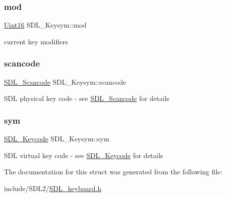 \subsubsection{\texorpdfstring{mod}{mod}}
{\footnotesize\ttfamily \hyperlink{_s_d_l__stdinc_8h_a31fcc0a076c9068668173ee26d33e42b}{Uint16} S\+D\+L\+\_\+\+Keysym\+::mod}

current key modifiers \mbox{\label{struct_s_d_l___keysym_ad47e9120a511e2efc7ec0c6d8a5ec51e}} 
\subsubsection{\texorpdfstring{scancode}{scancode}}
{\footnotesize\ttfamily \hyperlink{_s_d_l__scancode_8h_a82ab7cff701034fb40a47b5b3a02777b}{S\+D\+L\+\_\+\+Scancode} S\+D\+L\+\_\+\+Keysym\+::scancode}

S\+DL physical key code -\/ see \hyperlink{_s_d_l__scancode_8h_a82ab7cff701034fb40a47b5b3a02777b}{S\+D\+L\+\_\+\+Scancode} for details \mbox{\label{struct_s_d_l___keysym_a082ff1fd787b79fa6c3a445deb225f08}} 
\subsubsection{\texorpdfstring{sym}{sym}}
{\footnotesize\ttfamily \hyperlink{_s_d_l__keycode_8h_ae9265f064f13f0f74dfca26a67875171}{S\+D\+L\+\_\+\+Keycode} S\+D\+L\+\_\+\+Keysym\+::sym}

S\+DL virtual key code -\/ see \hyperlink{_s_d_l__keycode_8h_ae9265f064f13f0f74dfca26a67875171}{S\+D\+L\+\_\+\+Keycode} for details 

The documentation for this struct was generated from the following file\+:\begin{DoxyCompactItemize}
\item 
include/\+S\+D\+L2/\hyperlink{_s_d_l__keyboard_8h}{S\+D\+L\+\_\+keyboard.\+h}\end{DoxyCompactItemize}
